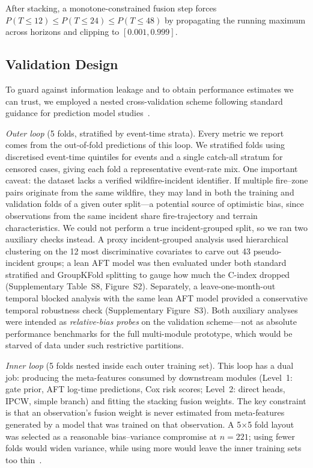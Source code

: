 \documentclass[fire,article,submit,pdftex]{../Definitions/mdpi}
\begin{document}
After stacking, a monotone-constrained fusion step forces $P(T \leq 12) \leq P(T \leq 24) \leq P(T \leq 48)$ by propagating the running maximum across horizons and clipping to $[0.001, 0.999]$.

\subsection{Validation Design}\label{sec:validation}

To guard against information leakage and to obtain performance estimates we can trust, we employed a nested cross-validation scheme following standard guidance for prediction model studies~\cite{Wolff2019,Steyerberg2019}.

\emph{Outer loop} (5 folds, stratified by event-time strata). Every metric we report comes from the out-of-fold predictions of this loop.
We stratified folds using discretised event-time quintiles for events and a single catch-all stratum for censored cases, giving each fold a representative event-rate mix.
One important caveat: the dataset lacks a verified wildfire-incident identifier. If multiple fire--zone pairs originate from the same wildfire, they may land in both the training and validation folds of a given outer split---a potential source of optimistic bias, since observations from the same incident share fire-trajectory and terrain characteristics.
We could not perform a true incident-grouped split, so we ran two auxiliary checks instead. A proxy incident-grouped analysis used hierarchical clustering on the 12 most discriminative covariates to carve out 43 pseudo-incident groups; a lean AFT model was then evaluated under both standard stratified and GroupKFold splitting to gauge how much the C-index dropped (Supplementary Table~S8, Figure~S2).
Separately, a leave-one-month-out temporal blocked analysis with the same lean AFT model provided a conservative temporal robustness check (Supplementary Figure~S3).
Both auxiliary analyses were intended as \emph{relative-bias probes} on the validation scheme---not as absolute performance benchmarks for the full multi-module prototype, which would be starved of data under such restrictive partitions.

\emph{Inner loop} (5 folds nested inside each outer training set). This loop has a dual job: producing the meta-features consumed by downstream modules (Level~1: gate prior, AFT log-time predictions, Cox risk scores; Level~2: direct heads, IPCW, simple branch) and fitting the stacking fusion weights.
The key constraint is that an observation's fusion weight is never estimated from meta-features generated by a model that was trained on that observation.
A 5$\times$5 fold layout was selected as a reasonable bias--variance compromise at $n = 221$; using fewer folds would widen variance, while using more would leave the inner training sets too thin~\cite{Steyerberg2019}.
\end{document}
